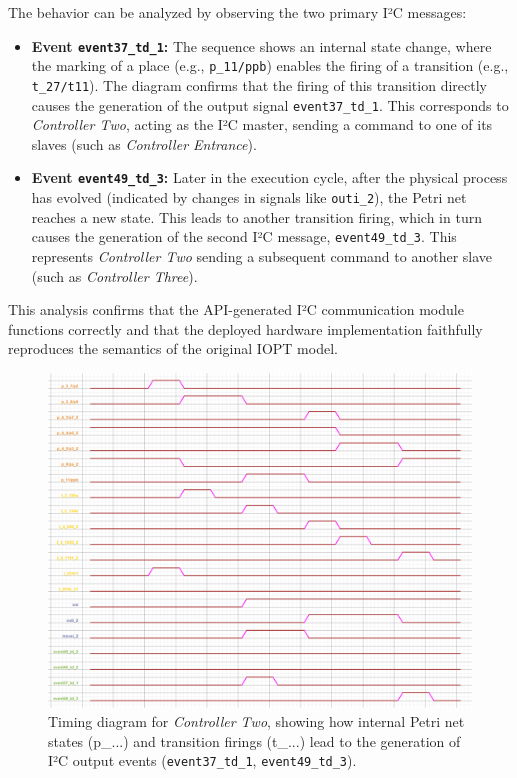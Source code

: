 The behavior can be analyzed by observing the two primary I²C messages:
\begin{itemize}
    \item \textbf{Event \texttt{event37\_td\_1}:} The sequence shows an internal state change, where the marking of a place (e.g., \texttt{p\_11/ppb}) enables the firing of a transition (e.g., \texttt{t\_27/t11}). The diagram confirms that the firing of this transition directly causes the generation of the output signal \texttt{event37\_td\_1}. This corresponds to \textit{Controller Two}, acting as the I²C master, sending a command to one of its slaves (such as \textit{Controller Entrance}).

    \item \textbf{Event \texttt{event49\_td\_3}:} Later in the execution cycle, after the physical process has evolved (indicated by changes in signals like \texttt{outi\_2}), the Petri net reaches a new state. This leads to another transition firing, which in turn causes the generation of the second I²C message, \texttt{event49\_td\_3}. This represents \textit{Controller Two} sending a subsequent command to another slave (such as \textit{Controller Three}).
\end{itemize}

This analysis confirms that the API-generated I²C communication module functions correctly and that the deployed hardware implementation faithfully reproduces the semantics of the original IOPT model.


\begin{figure}[htb!]
    \centering
    \includegraphics[width=\columnwidth]{Chapters/Figures/timing_diagram_controller2.png}
    \caption{Timing diagram for \textit{Controller Two}, showing how internal Petri net states (p\_...) and transition firings (t\_...) lead to the generation of I²C output events (\texttt{event37\_td\_1}, \texttt{event49\_td\_3}).}
    \label{fig:timing_diagram_controller2}
\end{figure}


